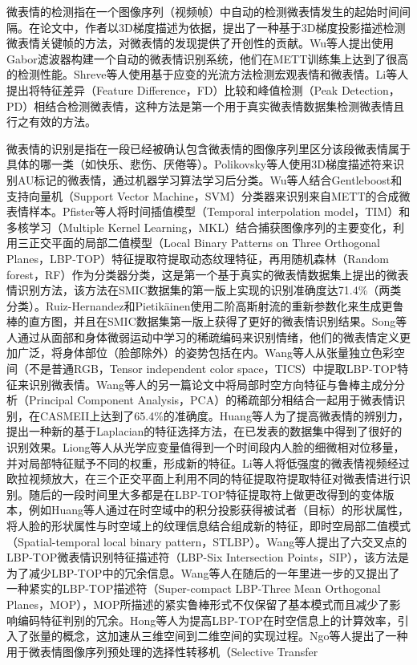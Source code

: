 微表情的检测指在一个图像序列（视频帧）中自动的检测微表情发生的起始时间间隔。在论文中，作者以3D梯度描述为依据，提出了一种基于3D梯度投影描述检测微表情关键帧的方法，对微表情的发现提供了开创性的贡献。Wu等人提出使用Gabor滤波器构建一个自动的微表情识别系统，他们在METT训练集上达到了很高的检测性能\citep{Qi2011The}。Shreve等人使用基于应变的光流方法检测宏观表情和微表情\citep{Shreve2009Towards, Shreve2011Macro}。Li等人提出将特征差异（Feature Difference，FD）比较和峰值检测（Peak Detection，PD）相结合检测微表情，这种方法是第一个用于真实微表情数据集检测微表情且行之有效的方法。

微表情的识别是指在一段已经被确认包含微表情的图像序列里区分该段微表情属于具体的哪一类（如快乐、悲伤、厌倦等）。Polikovsky等人使用3D梯度描述符来识别AU标记的微表情，通过机器学习算法学习后分类\citep{Polikovsky2013Facial}。Wu等人结合Gentleboost和支持向量机（Support Vector Machine，SVM）分类器来识别来自METT的合成微表情样本。Pfister等人将时间插值模型（Temporal interpolation model，TIM）和多核学习（Multiple Kernel Learning，MKL）结合捕获图像序列的主要变化，利用三正交平面的局部二值模型（Local Binary Patterns on Three Orthogonal Planes，LBP-TOP）特征提取符提取动态纹理特征\citep{zhao2007dynamic}，再用随机森林（Random forest，RF）作为分类器分类，这是第一个基于真实的微表情数据集上提出的微表情识别方法，该方法在SMIC数据集的第一版上实现的识别准确度达71.4\%（两类分类）\citep{pfister2011recognising}。Ruiz-Hernandez和Pietikäinen使用二阶高斯射流的重新参数化来生成更鲁棒的直方图，并且在SMIC数据集第一版上获得了更好的微表情识别结果\citep{ruiz2013encoding}。Song等人通过从面部和身体微弱运动中学习的稀疏编码来识别情绪，他们的微表情定义更加广泛，将身体部位（脸部除外）的姿势包括在内\citep{Song2013Learning}。Wang等人从张量独立色彩空间（不是普通RGB，Tensor independent color space，TICS）中提取LBP-TOP特征来识别微表情\citep{wang2014micro2}。Wang等人的另一篇论文中将局部时空方向特征与鲁棒主成分分析（Principal Component Analysis，PCA）的稀疏部分相结合一起用于微表情识别，在CASMEII上达到了65.4\%的准确度\citep{wang2014micro}。Huang等人为了提高微表情的辨别力，提出一种新的基于Laplacian的特征选择方法，在已发表的数据集中得到了很好的识别效果\citep{xiaohua2017discriminative}。Liong等人从光学应变量值得到一个时间段内人脸的细微相对位移量，并对局部特征赋予不同的权重，形成新的特征\citep{liong2014subtle}。Li等人将低强度的微表情视频经过欧拉视频放大，在三个正交平面上利用不同的特征提取符提取特征对微表情进行识别。随后的一段时间里大多都是在LBP-TOP特征提取符上做更改得到的变体版本，例如Huang等人通过在时空域中的积分投影获得被试者（目标）的形状属性，将人脸的形状属性与时空域上的纹理信息结合组成新的特征，即时空局部二值模式（Spatial-temporal local binary pattern，STLBP）\citep{Huang2015Facial}。Wang等人提出了六交叉点的LBP-TOP微表情识别特征描述符（LBP-Six Intersection Points，SIP），该方法是为了减少LBP-TOP中的冗余信息\citep{wang2014lbp}。Wang等人在随后的一年里进一步的又提出了一种紧实的LBP-TOP描述符（Super-compact LBP-Three Mean Orthogonal Planes，MOP），MOP所描述的紧实鲁棒形式不仅保留了基本模式而且减少了影响编码特征判别的冗余\citep{wang2015efficient}。Hong等人为提高LBP-TOP在时空信息上的计算效率，引入了张量的概念，这加速从三维空间到二维空间的实现过程\citep{FLBPTOP_2016}。Ngo等人提出了一种用于微表情图像序列预处理的选择性转移机（Selective Transfer 